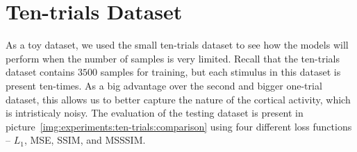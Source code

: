 \section{Ten-trials Dataset}
\label{experiments:ten-trials}
As a toy dataset, we used the small ten-trials dataset to see how the models will perform when the number of samples is very limited. Recall that the ten-trials dataset contains $3500$ samples for training, but each stimulus in this dataset is present ten-times. As a big advantage over the second and bigger one-trial dataset, this allows us to better capture the nature of the cortical activity, which is intristicaly noisy. The evaluation of the testing dataset is present in picture~\ref{img:experiments:ten-trials:comparison} using four different loss functions -- $L_1$, MSE, SSIM, and MSSSIM.

